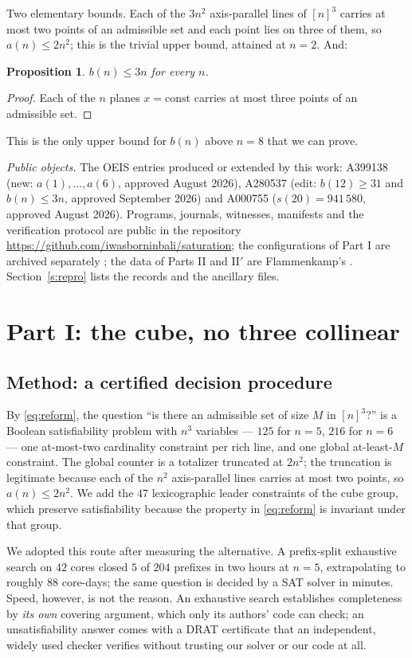 \documentclass[11pt,a4paper]{article}
\newtheorem{proposition}[theorem]{Proposition}
\begin{document}
Two elementary bounds.  Each of the $3n^2$ axis-parallel lines of $[n]^3$ carries at most two points of an admissible set and each
point lies on three of them, so $a(n)\le2n^2$; this is the trivial upper bound, attained at $n=2$.  And:
\begin{proposition}\label{p:3n}
$b(n)\le 3n$ for every $n$.
\end{proposition}
\begin{proof}
Each of the $n$ planes $x=\mathrm{const}$ carries at most three points of an admissible set.
\end{proof}
This is the only upper bound for $b(n)$ above $n=8$ that we can prove.

\emph{Public objects.}  The OEIS entries produced or extended by this work: A399138 (new: $a(1),\dots,a(6)$, approved
August 2026), A280537 (edit: $b(12)\ge31$ and $b(n)\le3n$, approved September 2026) and A000755 ($s(20)=941\,580$, approved
August 2026).  Programs, journals, witnesses, manifests and the verification protocol are public in the repository
\url{https://github.com/iwasborninbali/saturation}; the configurations of Part I are archived separately \cite{Witnesses}; the
data of Parts II and II$'$ are Flammenkamp's \cite{Flammenkamp}.  Section~\ref{s:repro} lists the records and the ancillary files.

\section{Part I: the cube, no three collinear}\label{s:cube3}

\subsection{Method: a certified decision procedure}\label{s:method3}
By \eqref{eq:reform}, the question ``is there an admissible set of size $M$ in $[n]^3$?'' is a Boolean satisfiability problem with
$n^3$ variables --- $125$ for $n=5$, $216$ for $n=6$ --- one at-most-two cardinality constraint per rich line,
and one global at-least-$M$ constraint.  The global counter is a totalizer truncated at $2n^2$; the truncation
is legitimate because each of the $n^2$ axis-parallel lines carries at most two points, so $a(n)\le 2n^2$.
We add the $47$ lexicographic leader constraints of the cube group, which preserve satisfiability because the
property in \eqref{eq:reform} is invariant under that group.

We adopted this route after measuring the alternative.  A prefix-split exhaustive search on $42$ cores closed
$5$ of $204$ prefixes in two hours at $n=5$, extrapolating to roughly $88$ core-days; the same question is
decided by a SAT solver in minutes.  Speed, however, is not the reason.  An exhaustive search establishes
completeness by \emph{its own} covering argument, which only its authors' code can check; an unsatisfiability
answer comes with a DRAT certificate that an independent, widely used checker verifies without trusting our
solver or our code at all.
\end{document}
